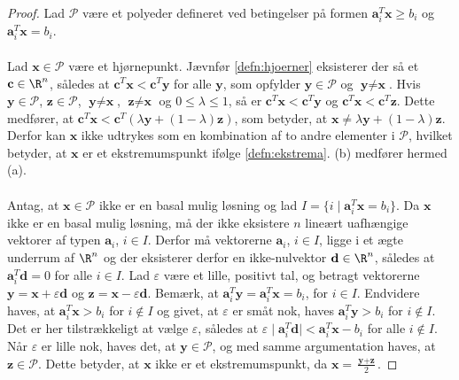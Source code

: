 \begin{proof}
Lad $\mathcal{P}$ være et polyeder defineret ved betingelser på formen $\textbf{a}_i^T\textbf{x} \geq b_i$ og $\textbf{a}_i^T\textbf{x} = b_i$.\\\\
%
Lad $\textbf{x} \in \mathcal{P}$ være et hjørnepunkt. Jævnfør \ref{defn:hjoerner} eksisterer der så et $\textbf{c} \in \R^n$, således at $\textbf{c}^T\textbf{x} < \textbf{c}^T\textbf{y}$ for alle $\textbf{y}$, som opfylder $\textbf{y} \in \mathcal{P}$ og $\textbf{y} \neq \textbf{x}$.
Hvis $\textbf{y} \in \mathcal{P}$, $\textbf{z} \in \mathcal{P}$, $\textbf{y} \neq \textbf{x}$, $\textbf{z} \neq \textbf{x}$ og $0 \leq \lambda \leq 1$, så er $\textbf{c}^T\textbf{x} < \textbf{c}^T\textbf{y}$ og $\textbf{c}^T\textbf{x} < \textbf{c}^T\textbf{z}$.
Dette medfører, at $\textbf{c}^T\textbf{x} < \textbf{c}^T(\lambda \textbf{y} + (1-\lambda)\textbf{z})$, som betyder, at $\textbf{x} \neq \lambda \textbf{y} + (1 - \lambda)\textbf{z}$.
Derfor kan $\textbf{x}$ ikke udtrykes som en kombination af to andre elementer i $\mathcal{P}$, hvilket betyder, at $\textbf{x}$ er et ekstremumspunkt ifølge \ref{defn:ekstrema}.
(b) medfører hermed (a).
\\\\
%
Antag, at $\textbf{x} \in \mathcal{P}$ ikke er en basal mulig løsning og lad $I = \{ i \mid \textbf{a}_i^T \textbf{x} = b_i\}$.
Da $\textbf{x}$ ikke er en basal mulig løsning, må der ikke eksistere $n$ lineært uafhængige vektorer af typen $\textbf{a}_i$, $i \in I$.
Derfor må vektorerne $\textbf{a}_i$, $i \in I$, ligge i et ægte underrum af $\R^n$ og der eksisterer derfor en ikke-nulvektor $\textbf{d} \in \R^n$, således at $\textbf{a}_i^T\textbf{d} = 0$ for alle $i \in I$.
Lad $\varepsilon$ være et lille, positivt tal, og betragt vektorerne $\textbf{y} = \textbf{x} + \varepsilon\textbf{d}$ og $\textbf{z} = \textbf{x} - \varepsilon\textbf{d}$.
Bemærk, at $\textbf{a}_i^T \textbf{y} = \textbf{a}_i^T \textbf{x} = b_i$, for $i \in I$.
Endvidere haves, at $\textbf{a}_i^T \textbf{x} > b_i$ for $i \notin I$ og givet, at $\varepsilon$ er småt nok, haves $\textbf{a}_i^T \textbf{y} > b_i$ for $i \notin I$.
Det er her tilstrækkeligt at vælge $\varepsilon$, således at $\varepsilon \mid \textbf{a}_i^T\textbf{d} \mid < \textbf{a}_i^T\textbf{x} - b_i$ for alle $i \notin I$.
Når $\varepsilon$ er lille nok, haves det, at $\textbf{y} \in \mathcal{P}$, og med samme argumentation haves, at $\textbf{z} \in \mathcal{P}$.
Dette betyder, at $\textbf{x}$ ikke er et ekstremumspunkt, da $\textbf{x} = \frac{\textbf{y} + \textbf{z}}{2}$.

\end{proof}
